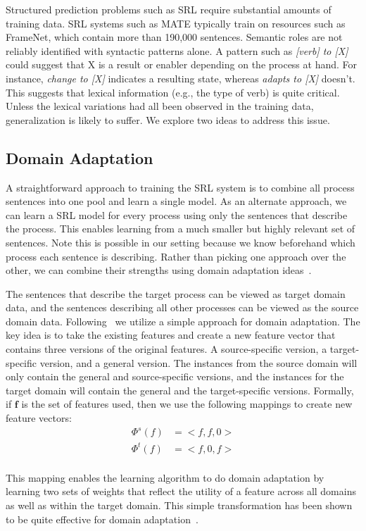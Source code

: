 Structured prediction problems such as SRL require substantial amounts of training data. 
SRL systems such as MATE typically train on resources such as FrameNet, which contain more than 190,000 sentences. 
Semantic roles are not reliably identified with syntactic patterns alone. 
A pattern such as {\em [verb] to [X]} could suggest that X is a result or enabler depending on the process at hand. 
For instance, {\em change to [X]} indicates a resulting state, whereas {\em adapts to [X]} doesn't. 
This suggests that lexical information (e.g., the type of verb) is quite critical. 
Unless the lexical variations had all been observed in the training data, generalization is likely to suffer. 
We explore two ideas to address this issue.

\subsection{Domain Adaptation}
\label{sec:domain-adaptation}
A straightforward approach to training the SRL system is to combine all process sentences into one pool and learn a single model. 
As an alternate approach, we can learn a SRL model for every process using only the sentences that describe the process. 
This enables learning from a much smaller but highly relevant set of sentences. 
Note this is possible in our setting because we know beforehand which process each sentence is describing.
Rather than picking one approach over the other, we can combine their strengths using domain adaptation ideas~\cite{daume2009frustratingly}.

The sentences that describe the target process can be viewed as target domain data, and the sentences describing all other processes can be viewed as the source domain data. Following~\cite{daume2009frustratingly} we utilize a simple approach for domain adaptation. The key idea is to take the existing features and create a new feature vector that contains three versions of the original features. A source-specific version, a target-specific version, and a general version. The instances from the source domain will only contain the general and source-specific versions, and the instances for the target domain will contain the general and the target-specific versions. Formally, if $\mathbf{f}$ is the set of features used, then we use the following mappings to create new feature vectors:\\
\begin{align*}
\Phi^{s}(f) &= <f, f, 0>\\
\Phi^{t}(f) &= <f, 0, f>\\
\end{align*}

This mapping enables the learning algorithm to do domain adaptation by learning two sets of weights that reflect the utility of a feature across all domains as well as within the target domain. This simple transformation has been shown to be quite effective for domain adaptation~\cite{daume2009frustratingly}.




